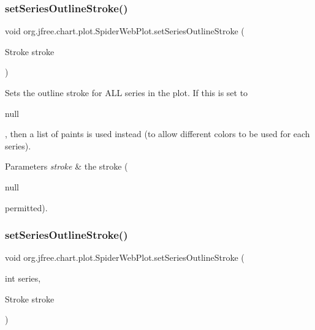 \subsubsection{\texorpdfstring{set\+Series\+Outline\+Stroke()}{setSeriesOutlineStroke()}\hspace{0.1cm}{\footnotesize\ttfamily [1/2]}}
{\footnotesize\ttfamily void org.\+jfree.\+chart.\+plot.\+Spider\+Web\+Plot.\+set\+Series\+Outline\+Stroke (\begin{DoxyParamCaption}\item[{Stroke}]{stroke }\end{DoxyParamCaption})}

Sets the outline stroke for A\+LL series in the plot. If this is set to 
\begin{DoxyCode}
null 
\end{DoxyCode}
 , then a list of paints is used instead (to allow different colors to be used for each series).


\begin{DoxyParams}{Parameters}
{\em stroke} & the stroke (
\begin{DoxyCode}
null 
\end{DoxyCode}
 permitted). \\
\hline
\end{DoxyParams}
\mbox{\label{classorg_1_1jfree_1_1chart_1_1plot_1_1_spider_web_plot_a8ff39f99b306dda63deeeee29b6cd6b3}} 
\subsubsection{\texorpdfstring{set\+Series\+Outline\+Stroke()}{setSeriesOutlineStroke()}\hspace{0.1cm}{\footnotesize\ttfamily [2/2]}}
{\footnotesize\ttfamily void org.\+jfree.\+chart.\+plot.\+Spider\+Web\+Plot.\+set\+Series\+Outline\+Stroke (\begin{DoxyParamCaption}\item[{int}]{series,  }\item[{Stroke}]{stroke }\end{DoxyParamCaption})}

